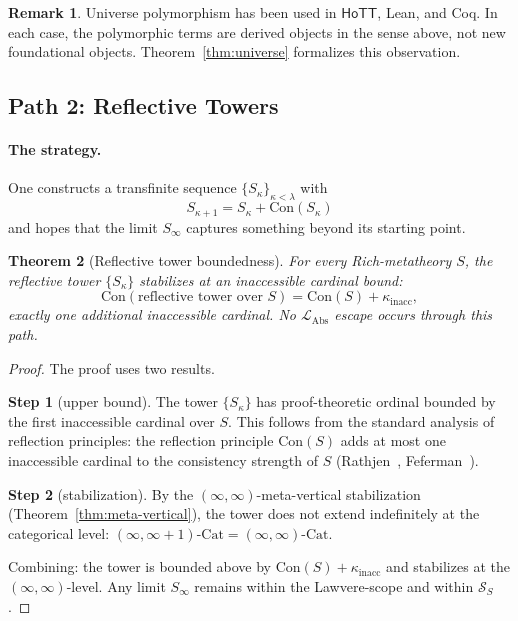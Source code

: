 \documentclass[11pt]{article}
\theoremstyle{plain}
\newtheorem{theorem}{Theorem}[section]
\theoremstyle{definition}
\newtheorem{remark}[theorem]{Remark}
\newcommand{\cS}{\mathcal{S}}
\newcommand{\LAbs}{\mathcal{L}_{\mathrm{Abs}}}
\newcommand{\Cat}{\mathrm{Cat}}
\newcommand{\Con}{\mathrm{Con}}
\newcommand{\HoTT}{\mathsf{HoTT}}
\begin{document}
\begin{remark}
Universe polymorphism has been used in $\HoTT$, Lean, and Coq. In each case, the polymorphic terms are derived objects in the sense above, not new foundational objects. Theorem~\ref{thm:universe} formalizes this observation.
\end{remark}

\subsection{Path 2: Reflective Towers}\label{sec:bypass-tower}

\paragraph{The strategy.} One constructs a transfinite sequence $\{S_\kappa\}_{\kappa < \lambda}$ with
\[ S_{\kappa+1} = S_\kappa + \Con(S_\kappa) \]
and hopes that the limit $S_\infty$ captures something beyond its starting point.

\begin{theorem}[Reflective tower boundedness]\label{thm:reflective}
For every Rich-metatheory $S$, the reflective tower $\{S_\kappa\}$ stabilizes at an inaccessible cardinal bound:
\[ \Con(\text{reflective tower over }S) = \Con(S) + \kappa_{\mathrm{inacc}}, \]
exactly one additional inaccessible cardinal. No $\LAbs$ escape occurs through this path.
\end{theorem}

\begin{proof}
The proof uses two results.

\textbf{Step 1} (upper bound). The tower $\{S_\kappa\}$ has proof-theoretic ordinal bounded by the first inaccessible cardinal over $S$. This follows from the standard analysis of reflection principles: the reflection principle $\Con(S)$ adds at most one inaccessible cardinal to the consistency strength of $S$ (Rathjen~\cite{Rathjen1999}, Feferman~\cite{Feferman1964}).

\textbf{Step 2} (stabilization). By the $(\infty, \infty)$-meta-vertical stabilization (Theorem~\ref{thm:meta-vertical}), the tower does not extend indefinitely at the categorical level: $(\infty, \infty + 1)\text{-}\Cat = (\infty, \infty)\text{-}\Cat$.

Combining: the tower is bounded above by $\Con(S) + \kappa_{\mathrm{inacc}}$ and stabilizes at the $(\infty, \infty)$-level. Any limit $S_\infty$ remains within the Lawvere-scope and within $\cS_S$.
\end{proof}
\end{document}
